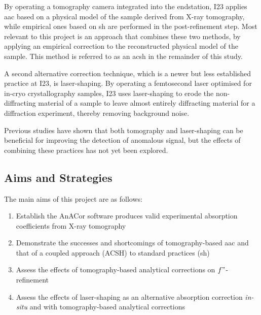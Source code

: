 By operating a tomography camera integrated into the endstation, I23 applies \ac{aac} based on a physical model of the sample derived from X-ray tomography, while empirical ones based on \ac{sh} are performed in the post-refinement step. Most relevant to this project is an approach that combines these two methods, by applying an empirical correction to the reconstructed physical model of the sample. This method is referred to as an \ac{acsh} in the remainder of this study. %

A second alternative correction technique, which is a newer but less established practice at I23, is laser-shaping. By operating a femtosecond laser optimised for in-cryo crystallography samples, I23 uses laser-shaping to erode the non-diffracting material of a sample to leave almost entirely diffracting material for a diffraction experiment, thereby removing background noise.

Previous studies have shown that both tomography and laser-shaping can be beneficial for improving the detection of anomalous signal, but the effects of combining these practices has not yet been explored.

\subsection{Aims and Strategies}

The main aims of this project are as follows:

\begin{enumerate}
    \item Establish the AnACor software produces valid experimental absorption coefficients from X-ray tomography
    \item Demonstrate the successes and shortcomings of tomography-based \ac{aac} and that of a coupled approach (ACSH) to standard practices (\ac{sh})
    \item Assess the effects of tomography-based analytical corrections on $f"$-refinement
    \item Assess the effects of laser-shaping as an alternative absorption correction \textit{in-situ} and with tomography-based analytical corrections
\end{enumerate}